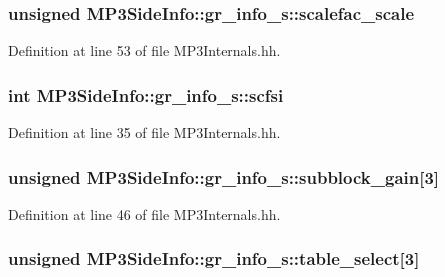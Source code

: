 \subsubsection[{scalefac\+\_\+scale}]{\setlength{\rightskip}{0pt plus 5cm}unsigned M\+P3\+Side\+Info\+::gr\+\_\+info\+\_\+s\+::scalefac\+\_\+scale}\label{structMP3SideInfo_1_1gr__info__s_aff6bf4148ebc5c6ba94688dceb3c99b4}


Definition at line 53 of file M\+P3\+Internals.\+hh.

\subsubsection[{scfsi}]{\setlength{\rightskip}{0pt plus 5cm}int M\+P3\+Side\+Info\+::gr\+\_\+info\+\_\+s\+::scfsi}\label{structMP3SideInfo_1_1gr__info__s_aab1d93cff3b846153ef8c624d90edf46}


Definition at line 35 of file M\+P3\+Internals.\+hh.

\subsubsection[{subblock\+\_\+gain}]{\setlength{\rightskip}{0pt plus 5cm}unsigned M\+P3\+Side\+Info\+::gr\+\_\+info\+\_\+s\+::subblock\+\_\+gain[3]}\label{structMP3SideInfo_1_1gr__info__s_a46dbd7deb5f402e0aab5db224549a42c}


Definition at line 46 of file M\+P3\+Internals.\+hh.

\subsubsection[{table\+\_\+select}]{\setlength{\rightskip}{0pt plus 5cm}unsigned M\+P3\+Side\+Info\+::gr\+\_\+info\+\_\+s\+::table\+\_\+select[3]}\label{structMP3SideInfo_1_1gr__info__s_abbec7885316ab2db8bdf2a1d3775e71c}


